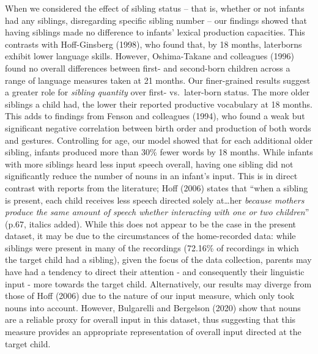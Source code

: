 \documentclass[
  man,floatsintext]{apa6}
\begin{document}
When we considered the effect of sibling status -- that is, whether or not infants had any siblings, disregarding specific sibling number -- our findings showed that having siblings made no difference to infants' lexical production capacities. This contrasts with Hoff-Ginsberg (1998), who found that, by 18 months, laterborns exhibit lower language skills. However, Oshima-Takane and colleagues (1996) found no overall differences between first- and second-born children across a range of language measures taken at 21 months. Our finer-grained results suggest a greater role for \emph{sibling quantity} over first- vs.~later-born status. The more older siblings a child had, the lower their reported productive vocabulary at 18 months. This adds to findings from Fenson and colleagues (1994), who found a weak but significant negative correlation between birth order and production of both words and gestures. Controlling for age, our model showed that for each additional older sibling, infants produced more than 30\% fewer words by 18 months.
While infants with more siblings heard less input speech overall, having one sibling did not significantly reduce the number of nouns in an infant's input. This is in direct contrast with reports from the literature; Hoff (2006) states that ``when a sibling is present, each child receives less speech directed solely at\ldots her \emph{because mothers produce the same amount of speech whether interacting with one or two children}'' (p.67, italics added). While this does not appear to be the case in the present dataset, it may be due to the circumstances of the home-recorded data: while siblings were present in many of the recordings (72.16\% of recordings in which the target child had a sibling), given the focus of the data collection, parents may have had a tendency to direct their attention - and consequently their linguistic input - more towards the target child. Alternatively, our results may diverge from those of Hoff (2006) due to the nature of our input measure, which only took nouns into account. However, Bulgarelli and Bergelson (2020) show that nouns are a reliable proxy for overall input in this dataset, thus suggesting that this measure provides an appropriate representation of overall input directed at the target child.
\end{document}
